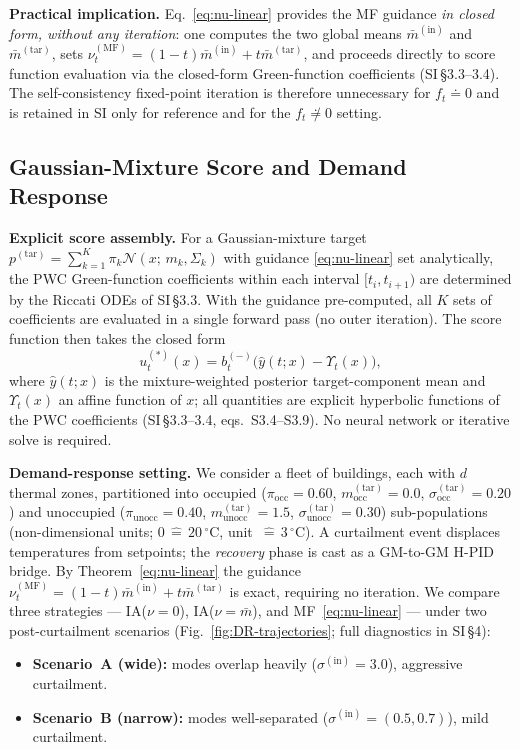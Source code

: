 \documentclass[11pt,onecolumn]{article}
\newcommand{\calN}{\mathcal{N}}
\newcommand{\ptar}{p^{(\mathrm{tar})}}
\newcommand{\sstar}{u^{(*)}}
\newcommand{\MF}{\mathrm{MF}}
\begin{document}
\textbf{Practical implication.} Eq.~\eqref{eq:nu-linear} provides the MF guidance \emph{in closed form, without any iteration}: one computes the two global means $\bar m^{(\mathrm{in})}$ and $\bar m^{(\mathrm{tar})}$, sets $\nu_t^{(\MF)} = (1-t)\bar m^{(\mathrm{in})} + t\bar m^{(\mathrm{tar})}$, and proceeds directly to score function evaluation via the closed-form Green-function coefficients (SI\,\S3.3--3.4). The self-consistency fixed-point iteration is therefore unnecessary for $f_t\doteq  0$ and is retained in SI only for reference and for the $f_t\not\doteq  0$ setting.

\subsection*{Gaussian-Mixture Score and Demand Response}

\textbf{Explicit score assembly.} For a Gaussian-mixture target $\ptar = \sum_{k=1}^K \pi_k\calN(x;\,m_k,\Sigma_k)$ with guidance \eqref{eq:nu-linear} set analytically, the PWC Green-function coefficients within each interval $[t_i, t_{i+1})$ are determined by the Riccati ODEs of SI\,\S3.3. With the guidance pre-computed, all $K$ sets of coefficients are evaluated in a single forward pass (no outer iteration). The score function then takes the closed form
\begin{equation}
  \sstar_t(x)
  = b_t^{(-)}\bigl(\hat y(t;x) - \Upsilon_t(x)\bigr),
  \label{eq:score}
\end{equation}
where $\hat y(t;x)$ is the mixture-weighted posterior target-component mean and $\Upsilon_t(x)$ an affine function of $x$; all quantities are explicit hyperbolic functions of the PWC coefficients (SI\,\S3.3--3.4, eqs.~S3.4--S3.9). No neural network or iterative solve is required.

\textbf{Demand-response setting.} We consider a fleet of buildings, each with $d$ thermal zones, partitioned into occupied ($\pi_\mathrm{occ}=0.60$, $m^{(\mathrm{tar})}_\mathrm{occ}=0.0$, $\sigma^{(\mathrm{tar})}_\mathrm{occ}=0.20$) and unoccupied ($\pi_\mathrm{unocc}=0.40$, $m^{(\mathrm{tar})}_\mathrm{unocc}=1.5$, $\sigma^{(\mathrm{tar})}_\mathrm{unocc}=0.30$) sub-populations (non-dimensional units; $0\,\widehat{=}\,20\,^\circ\mathrm{C}$, unit~$\widehat{=}\,3\,^\circ\mathrm{C}$). A curtailment event displaces temperatures from setpoints; the \emph{recovery} phase is cast as a GM-to-GM H-PID bridge. By Theorem~\eqref{eq:nu-linear} the guidance $\nu_t^{(\MF)}=(1{-}t)\bar m^{(\mathrm{in})}+t\bar m^{(\mathrm{tar})}$ is exact, requiring no iteration. We compare three strategies --- IA($\nu{=}0$), IA($\nu{=}\bar{m}$), and MF~\eqref{eq:nu-linear} --- under two post-curtailment scenarios (Fig.~\ref{fig:DR-trajectories}; full diagnostics in SI\,\S4):
\begin{itemize}
  \item \textbf{Scenario~A (wide):} modes overlap heavily ($\sigma^{(\mathrm{in})}=3.0$), aggressive curtailment.
  
  \item \textbf{Scenario~B (narrow):} modes well-separated ($\sigma^{(\mathrm{in})}=(0.5,0.7)$), mild curtailment.
\end{itemize}
\end{document}
